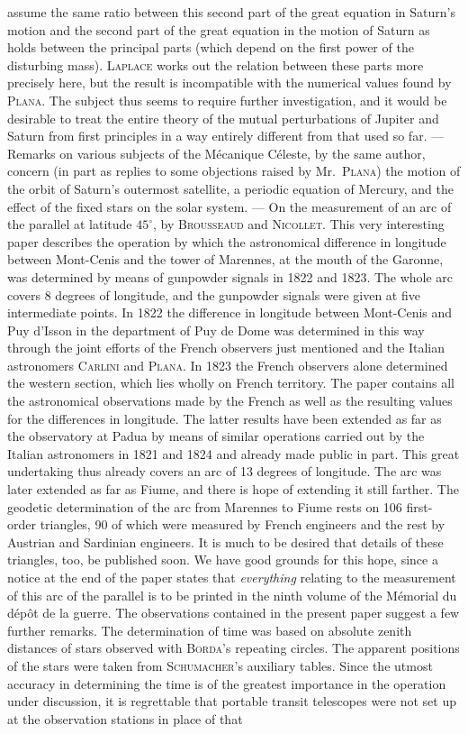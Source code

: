 assume the same ratio between this second part of the great equation in Saturn's motion and the second part of the great equation in the motion of Saturn as holds between the principal parts (which depend on the first power of the disturbing mass). \textsc{Laplace} works out the relation between these parts more precisely here, but the result is incompatible with the numerical values found by \textsc{Plana}. The subject thus seems to require further investigation, and it would be desirable to treat the entire theory of the mutual perturbations of Jupiter and Saturn from first principles in a way entirely different from that used so far. --- Remarks on various subjects of the Mécanique Céleste, by the same author, concern (in part as replies to some objections raised by Mr.\ \textsc{Plana}) the motion of the orbit of Saturn's outermost satellite, a periodic equation of Mercury, and the effect of the fixed stars on the solar system. --- On the measurement of an arc of the parallel at latitude $45^\circ$, by \textsc{Brousseaud} and \textsc{Nicollet}. This very interesting paper describes the operation by which the astronomical difference in longitude between Mont-Cenis and the tower of Marennes, at the mouth of the Garonne, was determined by means of gunpowder signals in 1822 and 1823. The whole arc covers 8 degrees of longitude, and the gunpowder signals were given at five intermediate points. In 1822 the difference in longitude between Mont-Cenis and Puy d'Isson in the department of Puy de Dome was determined in this way through the joint efforts of the French observers just mentioned and the Italian astronomers \textsc{Carlini} and \textsc{Plana}. In 1823 the French observers alone determined the western section, which lies wholly on French territory. The paper contains all the astronomical observations made by the French as well as the resulting values for the differences in longitude. The latter results have been extended as far as the observatory at Padua by means of similar operations carried out by the Italian astronomers in 1821 and 1824 and already made public in part. This great undertaking thus already covers an arc of 13 degrees of longitude. The arc was later extended as far as Fiume, and there is hope of extending it still farther. The geodetic determination of the arc from Marennes to Fiume rests on 106 first-order triangles, 90 of which were measured by French engineers and the rest by Austrian and Sardinian engineers. It is much to be desired that details of these triangles, too, be published soon. We have good grounds for this hope, since a notice at the end of the paper states that \emph{everything} relating to the measurement of this arc of the parallel is to be printed in the ninth volume of the Mémorial du dépôt de la guerre. The observations  contained in the present paper suggest a few further remarks. The determination of time was based on absolute zenith distances of stars observed with \textsc{Borda}'s repeating circles. The apparent positions of the stars were taken from \textsc{Schumacher}'s auxiliary tables. Since the utmost accuracy in determining the time is of the greatest importance in the operation under discussion, it is regrettable that portable transit telescopes were not set up at the observation stations in place of that 